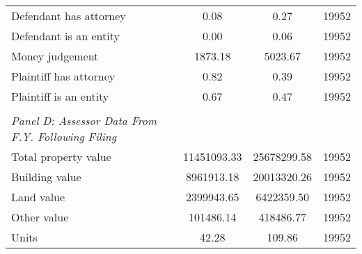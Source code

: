 \begin{table}[htbp]
\begin{tabular}{l*{1}{ccc}}
\hspace{0.25cm}Defendant has attorney&        0.08&        0.27&       19952\\
\hspace{0.25cm}Defendant is an entity&        0.00&        0.06&       19952\\
\hspace{0.25cm}Money judgement&     1873.18&     5023.67&       19952\\
\hspace{0.25cm}Plaintiff has attorney&        0.82&        0.39&       19952\\
\hspace{0.25cm}Plaintiff is an entity&        0.67&        0.47&       19952\\
\vspace{0.1em} \\ \emph{Panel D: Assessor Data From F.Y. Following Filing}&            &            &            \\
\hspace{0.25cm}Total property value& 11451093.33& 25678299.58&       19952\\
\hspace{0.25cm}Building value&  8961913.18& 20013320.26&       19952\\
\hspace{0.25cm}Land value&  2399943.65&  6422359.50&       19952\\
\hspace{0.25cm}Other value&   101486.14&   418486.77&       19952\\
\hspace{0.25cm}Units&       42.28&      109.86&       19952\\
\bottomrule
\end{tabular}
\end{table}
